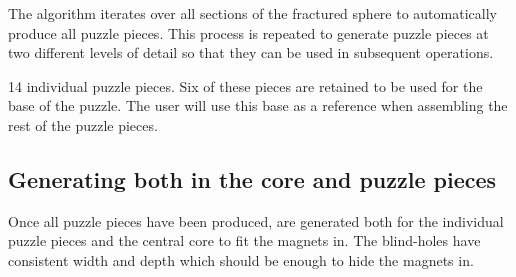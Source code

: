 \documentclass[acmlarge,screen,dvipsnames]{acmart}
\begin{document}
%

The algorithm iterates over all sections of the fractured sphere to
automatically produce all puzzle pieces. This process is repeated to
generate puzzle pieces at two different levels of detail so that they
can be used in subsequent operations.

 14 individual puzzle pieces. Six of these pieces are retained
  to be used for the base of the puzzle. The user will use this base
  as a reference when assembling the rest of the puzzle pieces. 


\subsection{Generating  both in the core and puzzle pieces}

Once all puzzle pieces have been produced,  are
generated both for the individual puzzle pieces and the central core
to fit the magnets in. The blind-holes have consistent width and depth
which should be enough to hide the magnets in.
\end{document}
